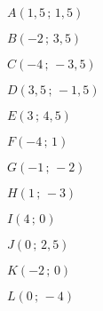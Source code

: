    \begin{colitemize}{3}
      \item \blue $A(1,5\,;\,1,5)$
      \item \blue $B(-2\,;\,3,5)$
      \item \blue $C(-4\,;\,-3,5)$
      \item \blue $D(3,5\,;\,-1,5)$
      \item \blue $E(3\,;\,4,5)$
      \item \blue $F(-4\,;\,1)$
      \item \blue $G(-1\,;\,-2)$
      \item \blue $H(1\,;\,-3)$
      \item \blue $I(4\,;\,0)$
      \item \blue $J(0\,;\,2,5)$
      \item \blue $K(-2\,;\,0)$
      \item \blue $L(0\,;\,-4)$
   \end{colitemize}
   \vspace*{-5mm}
